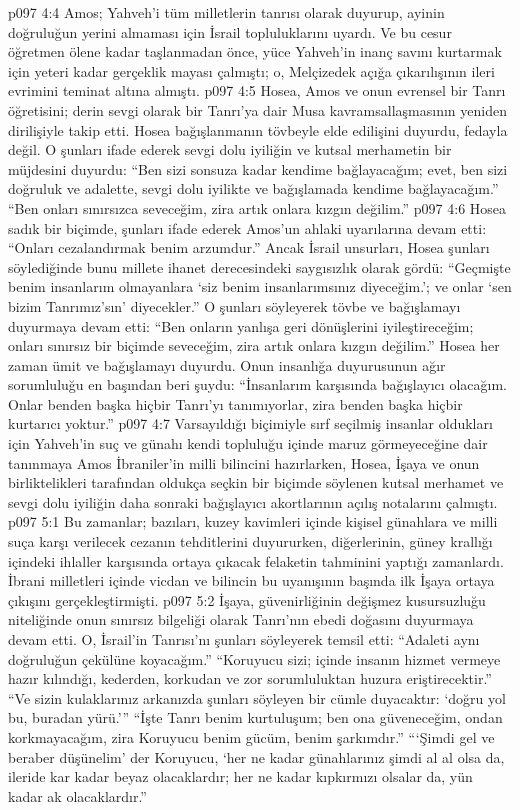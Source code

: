 \vs p097 4:4 Amos; Yahveh’i tüm milletlerin tanrısı olarak duyurup, ayinin doğruluğun yerini almaması için İsrail topluluklarını uyardı. Ve bu cesur öğretmen ölene kadar taşlanmadan önce, yüce Yahveh’in inanç savını kurtarmak için yeteri kadar gerçeklik mayası çalmıştı; o, Melçizedek açığa çıkarılışının ileri evrimini teminat altına almıştı.
\vs p097 4:5 Hosea, Amos ve onun evrensel bir Tanrı öğretisini; derin sevgi olarak bir Tanrı’ya dair Musa kavramsallaşmasının yeniden dirilişiyle takip etti. Hosea bağışlanmanın tövbeyle elde edilişini duyurdu, fedayla değil. O şunları ifade ederek sevgi dolu iyiliğin ve kutsal merhametin bir müjdesini duyurdu: “Ben sizi sonsuza kadar kendime bağlayacağım; evet, ben sizi doğruluk ve adalette, sevgi dolu iyilikte ve bağışlamada kendime bağlayacağım.” “Ben onları sınırsızca seveceğim, zira artık onlara kızgın değilim.”
\vs p097 4:6 Hosea sadık bir biçimde, şunları ifade ederek Amos’un ahlaki uyarılarına devam etti: “Onları cezalandırmak benim arzumdur.” Ancak İsrail unsurları, Hosea şunları söylediğinde bunu millete ihanet derecesindeki saygısızlık olarak gördü: “Geçmişte benim insanlarım olmayanlara ‘siz benim insanlarımsınız diyeceğim.’; ve onlar ‘sen bizim Tanrımız’sın’ diyecekler.” O şunları söyleyerek tövbe ve bağışlamayı duyurmaya devam etti: “Ben onların yanlışa geri dönüşlerini iyileştireceğim; onları sınırsız bir biçimde seveceğim, zira artık onlara kızgın değilim.” Hosea her zaman ümit ve bağışlamayı duyurdu. Onun insanlığa duyurusunun ağır sorumluluğu en başından beri şuydu: “İnsanlarım karşısında bağışlayıcı olacağım. Onlar benden başka hiçbir Tanrı’yı tanımıyorlar, zira benden başka hiçbir kurtarıcı yoktur.”
\vs p097 4:7 Varsayıldığı biçimiyle sırf seçilmiş insanlar oldukları için Yahveh’in suç ve günahı kendi topluluğu içinde maruz görmeyeceğine dair tanınmaya Amos İbraniler’in milli bilincini hazırlarken, Hosea, İşaya ve onun birliktelikleri tarafından oldukça seçkin bir biçimde söylenen kutsal merhamet ve sevgi dolu iyiliğin daha sonraki bağışlayıcı akortlarının açılış notalarını çalmıştı.
\vs p097 5:1 Bu zamanlar; bazıları, kuzey kavimleri içinde kişisel günahlara ve milli suça karşı verilecek cezanın tehditlerini duyururken, diğerlerinin, güney krallığı içindeki ihlaller karşısında ortaya çıkacak felaketin tahminini yaptığı zamanlardı. İbrani milletleri içinde vicdan ve bilincin bu uyanışının başında ilk İşaya ortaya çıkışını gerçekleştirmişti.
\vs p097 5:2 İşaya, güvenirliğinin değişmez kusursuzluğu niteliğinde onun sınırsız bilgeliği olarak Tanrı’nın ebedi doğasını duyurmaya devam etti. O, İsrail’in Tanrısı’nı şunları söyleyerek temsil etti: “Adaleti aynı doğruluğun çekülüne koyacağım.” “Koruyucu sizi; içinde insanın hizmet vermeye hazır kılındığı, kederden, korkudan ve zor sorumluluktan huzura eriştirecektir.” “Ve sizin kulaklarınız arkanızda şunları söyleyen bir cümle duyacaktır: ‘doğru yol bu, buradan yürü.’” “İşte Tanrı benim kurtuluşum; ben ona güveneceğim, ondan korkmayacağım, zira Koruyucu benim gücüm, benim şarkımdır.” “‘Şimdi gel ve beraber düşünelim’ der Koruyucu, ‘her ne kadar günahlarınız şimdi al al olsa da, ileride kar kadar beyaz olacaklardır; her ne kadar kıpkırmızı olsalar da, yün kadar ak olacaklardır.”
